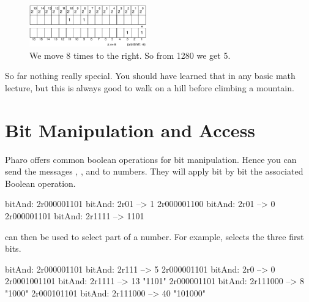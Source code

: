 \documentclass[a4paper,10pt,twoside]{book}
\begin{document}


\begin{figure}[h]
\begin{center}
\includegraphics[width=0.45\textwidth]{16bits-1280shifted8}
\caption{We move 8 times to the right. So from 1280 we get 5.\label{16bits-1280shifted8}}
\end{center}
\end{figure}

So far nothing really special. You should have learned that in any basic math lecture, but this is always good 
to walk on a hill before climbing a mountain.  

\section{Bit Manipulation and Access}

Pharo offers common boolean operations for bit manipulation. Hence you can send the messages , , and  to numbers. 
They will apply bit by bit the associated Boolean operation.


\begin{code}{bitAnd:}
2r000001101 bitAnd: 2r01
	--> 1 
2r000001100 bitAnd: 2r01
	--> 0 	
2r000001101 bitAnd: 2r1111
	--> 1101 
\end{code}

 can then be used to select part of a number. For example,  selects the three first bits. 


\begin{code}{bitAnd:}
2r000001101 bitAnd: 2r111
	--> 5
2r000001101 bitAnd: 2r0
	--> 0 	
2r0001001101 bitAnd: 2r1111
	--> 13			"1101"
2r000001101 bitAnd: 2r111000
	--> 8 			"1000"
2r000101101 bitAnd: 2r111000
   --> 40 			"101000"
\end{code}
\end{document}
